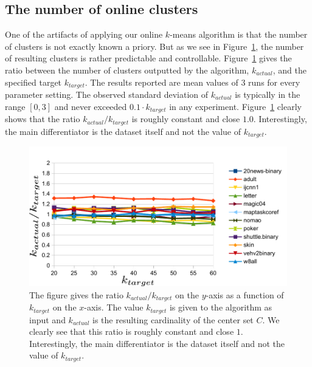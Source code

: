 \documentclass{article}
\begin{document}
\subsection{The number of online clusters}
One of the artifacts of applying our online $k$-means algorithm is that the number of clusters is not exactly known a priory.
But as we see in Figure~\ref{fig1}, the number of resulting clusters is rather predictable and controllable.
Figure~\ref{fig1} gives the ratio between the number of clusters outputted by the algorithm, $k_{actual}$, and the specified target $k_{target}$.
The results reported are mean values of $3$ runs for every parameter setting. 
The observed standard deviation of $k_{actual}$ is typically in the range $[0,3]$ and never exceeded $0.1\cdot k_{target}$ in any experiment.
Figure~\ref{fig1} clearly shows that the ratio $k_{actual}/k_{target}$ is roughly constant and close $1.0$. 
Interestingly, the main differentiator is the dataset itself and not the value of $k_{target}$.

\begin{figure}[htbp]
\begin{center}
\includegraphics{figures/plot1.pdf}
\caption{The figure gives the ratio $k_{actual}/k_{target}$ on the $y$-axis as a function of $k_{target}$ on the $x$-axis.
The value $k_{target}$ is given to the algorithm as input and $k_{actual}$ is the resulting cardinality of the center set $C$.
We clearly see that this ratio is roughly constant and close $1$. Interestingly, the main differentiator is the dataset itself and not the value of $k_{target}$.
}
\label{fig1}
\end{center}
\end{figure}
\end{document}
